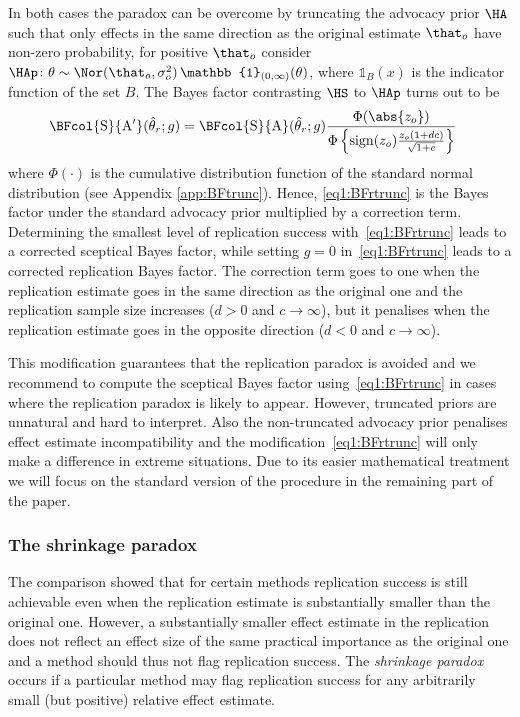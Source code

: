 In both cases the paradox can be overcome by truncating the advocacy prior $\HA$
such that only effects in the same direction as the original estimate $\that_o$
have non-zero probability, \ie for positive $\that_{o}$ consider
$\HAp \colon \theta \sim \Nor(\that_o, \sigma^2_o) \, \mathbb{1}_{(0, \infty)}(\theta)$,
where $\mathbb{1}_{B}(x)$ is the indicator function of the set $B$. The Bayes
factor contrasting $\HS$ to $\HAp$ turns out to be
\begin{align}
  \BFcol{\mathrm{S}}{\mathrm{A}^\prime}(\hat{\theta}_r; g)
  &= \BFcol{\mathrm{S}}{\mathrm{A}}(\hat{\theta}_r; g)
  \frac{\Phi(\abs{z_o})}{\Phi\left\{\mathrm{sign}(z_o)
    \frac{z_o(1 + dc)}{\sqrt{1 + c}} \right\}}
   \label{eq1:BFrtrunc}
\end{align}
where $\Phi(\cdot)$ is the cumulative distribution function of the standard
normal distribution (see Appendix \ref{app:BFtrunc}). Hence, \eqref{eq1:BFrtrunc}
is the Bayes factor under the standard advocacy prior multiplied by a correction
term. Determining the smallest level of replication success
with~\eqref{eq1:BFrtrunc} leads to a corrected sceptical Bayes factor, while
setting $g = 0$ in~\eqref{eq1:BFrtrunc} leads to a corrected replication Bayes
factor. The correction term goes to one when the replication estimate goes in
the same direction as the original one and the replication sample size increases
($d > 0$ and $c \to \infty$), but it penalises when the replication estimate
goes in the opposite direction ($d < 0$ and $c \to \infty$).

This modification guarantees that the replication paradox is avoided and we
recommend to compute the sceptical Bayes factor using~\eqref{eq1:BFrtrunc} in
cases where the replication paradox is likely to appear. However, truncated
priors are unnatural and hard to interpret. Also the non-truncated advocacy
prior penalises effect estimate incompatibility and the
modification~\eqref{eq1:BFrtrunc} will only make a difference in extreme
situations. Due to its easier mathematical treatment we will focus on the
standard version of the procedure in the remaining part of the paper.


\subsubsection{The shrinkage paradox}
The comparison showed that for certain methods replication success is still
achievable even when the replication estimate is substantially smaller than the
original one. However, a substantially smaller effect estimate in the
replication does not reflect an effect size of the same practical importance as
the original one and a method should thus not flag replication success. The {\em
shrinkage paradox} occurs if a particular method may flag replication success
for any arbitrarily small (but positive) relative effect estimate.

